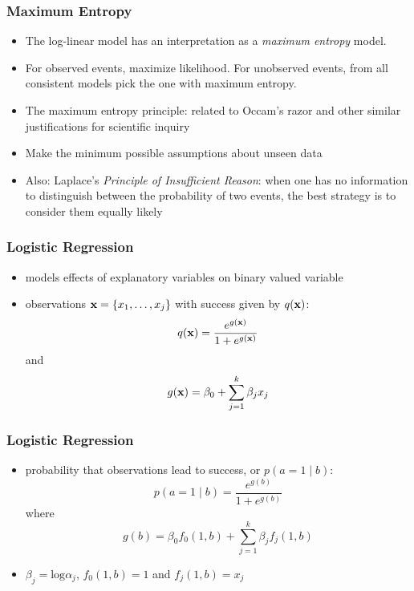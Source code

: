 



\begin{frame}
\frametitle{Maximum Entropy}
\begin{itemize}[<+->]
\item The log-linear model has an interpretation as a {\it maximum entropy} model.
\item For observed events, maximize likelihood. For unobserved events, from all
consistent models pick the one with maximum entropy.
\item The maximum entropy principle: related to Occam's razor and
  other similar justifications for scientific inquiry
\item Make the minimum possible assumptions about unseen data
\item Also: Laplace's {\em Principle of Insufficient Reason}: when one
  has no information to distinguish between the probability of two
  events, the best strategy is to consider them equally likely
\end{itemize}
\end{frame}

\begin{frame}
\frametitle{Logistic Regression}
\begin{itemize}
\item models effects of explanatory variables on binary valued
  variable
\item observations ${\bf x} = \{x_1, \ldots, x_j\}$ with success given
  by $q({\bf x})$: \[ q({\bf x}) = \frac{e^{g({\bf x})}}{1 + e^{g({\bf
  x})}} \] and \[ g({\bf x}) = \beta_0 + \sum_{j=1}^{k} \beta_j x_j \]
\end{itemize} 
\end{frame} 

\begin{frame}
\frametitle{Logistic Regression}
\begin{itemize}
\item probability that observations lead to success, or $p(a=1 \mid
  b)$:
 \[ p(a=1 \mid b) = \frac{e^{g(b)}}{1 + e^{g(b)}} \] where
 \[ g(b) = \beta_0 f_0(1,b) + \sum_{j=1}^{k} \beta_j f_j(1,b) \]
\item $\beta_j = \textrm{log} \alpha_j$, $f_0(1,b) = 1$ and $f_j(1,b) = x_j$
\end{itemize} 
\end{frame} 
